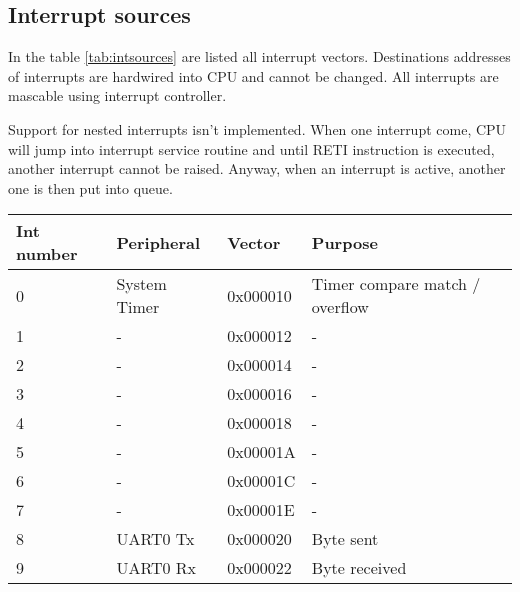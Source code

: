 \subsection{Interrupt sources}

In the table \ref{tab:intsources} are listed all interrupt vectors. Destinations
addresses of interrupts are hardwired into CPU and cannot be changed. All
interrupts are mascable using interrupt controller.

Support for nested interrupts isn't implemented. When one interrupt come, CPU
will jump into interrupt service routine and until RETI instruction is executed,
another interrupt cannot be raised. Anyway, when an interrupt is active, another
one is then put into queue.

\begin{table}[h]
    \centering
    \begin{tabular}{|l|l|l|l|}
        \hline
        \textbf{Int number} & \textbf{Peripheral} & \textbf{Vector} & \textbf{Purpose}               \\ \hline
        0                   & System Timer        & 0x000010        & Timer compare match / overflow \\ \hline
        1                   & -                   & 0x000012        & -                              \\ \hline
        2                   & -                   & 0x000014        & -                              \\ \hline
        3                   & -                   & 0x000016        & -                              \\ \hline
        4                   & -                   & 0x000018        & -                              \\ \hline
        5                   & -                   & 0x00001A        & -                              \\ \hline
        6                   & -                   & 0x00001C        & -                              \\ \hline
        7                   & -                   & 0x00001E        & -                              \\ \hline
        8                   & UART0 Tx            & 0x000020        & Byte sent                      \\ \hline
        9                   & UART0 Rx            & 0x000022        & Byte received                  \\ \hline

\end{tabular}
\end{table}
